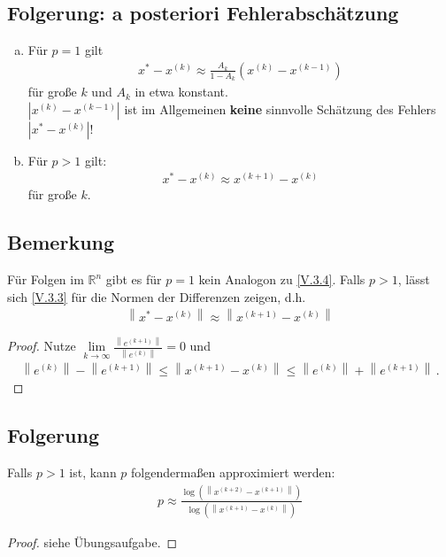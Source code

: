 \documentclass[ngerman,fontsize=11pt, paper=a4, parskip=half, titlepage=true, toc=bib]{scrbook}
\newcommand{\R}{\mathds{R}}
\newcommand{\nn}[1]{\left\| #1 \right\|}
\begin{document}
	\subsection{Folgerung: a posteriori Fehlerabschätzung}
	\begin{enumerate}[a)]
		\item Für $p=1$ gilt
		\begin{gather}
			x^{*}-x^{(k)} \approx \frac{A_k}{1-A_k}(x^{(k)}-x^{(k-1)})
			\label{V.3.4}
		\end{gather}
		für große $k$ und $A_k$ in etwa konstant. \\
		$|x^{(k)}-x^{(k-1)}|$ ist im Allgemeinen \textbf{keine} sinnvolle Schätzung
		des Fehlers $|x^{*}-x^{(k)}|$!
		\item Für $p>1$ gilt:
		\begin{gather}
			x^{*}-x^{(k)} \approx x^{(k+1)}-x^{(k)}
			\label{V.3.5}
		\end{gather}
		für große $k$.
	\end{enumerate}
		
	\subsection{Bemerkung}
	Für Folgen im $\R^n$ gibt es für $p=1$ kein Analogon zu \eqref{V.3.4}.
	Falls $p>1$, lässt sich \eqref{V.3.3} für die Normen der Differenzen zeigen,
	d.h.
	\begin{gather}
		\nn{x^{*}-x^{(k)}} \approx \nn{x^{(k+1)}-x^{(k)}}
		\label{V.3.6}
	\end{gather}
	
	\begin{proof}
		Nutze $\lim\limits_{k\rightarrow\infty} \frac{\nn{e^{(k+1)}}}{\nn{e^{(k)}}} =0$
		und 
		\begin{gather*}
			\nn{e^{(k)}}-\nn{e^{(k+1)}}\leq \nn{x^{(k+1)}-x^{(k)}} \leq \nn{e^{(k)}}+\nn{e^{(k+1)}} \, .
		\end{gather*}
	\end{proof}
	
	\subsection{Folgerung}
	Falls $p>1$ ist, kann $p$ folgendermaßen approximiert werden:
	\begin{gather*}
		p \approx \frac{\log(\nn{x^{(k+2)}-x^{(k+1)}})}{\log(\nn{x^{(k+1)}-x^{(k)}})}
	\end{gather*}
	
	\begin{proof}
		siehe Übungsaufgabe.
	\end{proof}
	
\end{document}
